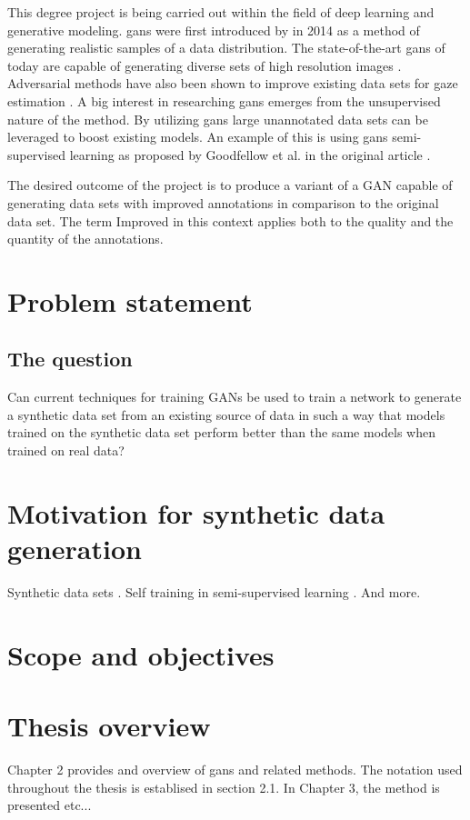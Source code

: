 
This degree project is being carried out within the field of deep learning and generative modeling. \acrlong{gans} were first introduced by \textcite{goodfellow2014generative} in 2014 as a method of generating realistic samples of a data distribution. The state-of-the-art \acrshort{gans} of today are capable of generating diverse sets of high resolution images \cite{karras2017progressive}. Adversarial methods have also been shown to improve existing data sets for gaze estimation \cite{shrivastava2016learning}. A big interest in researching \acrshort{gans} emerges from the unsupervised nature of the method. By utilizing \acrshort{gans} large unannotated data sets can be leveraged to boost existing models. An example of this is using \acrshort{gans} semi-supervised learning as proposed by Goodfellow et al. in the original article \cite{goodfellow2014generative}.

The desired outcome of the project is to produce a variant of a GAN capable of
generating data sets with improved annotations in comparison to the original data
set. The term Improved in this context applies
both to the quality and the quantity of the annotations.

\section{Problem statement}
\subsection{The question}
Can current techniques for training GANs be used to train a network to generate a synthetic data set from
an existing source of data in such a way that models trained on the synthetic
data set perform better than the same models when trained on real data?

\section{Motivation for synthetic data generation}
Synthetic data sets \textcite{patki2016synthetic}. Self training in semi-supervised learning \parencite{wuliu2017selftrainsemisup}. And more.

\section{Scope and objectives}

\section{Thesis overview}
Chapter 2 provides and overview of \acrlong{gans} and related methods. The notation used throughout the thesis is establised in section 2.1. In Chapter 3, the method is presented etc...



